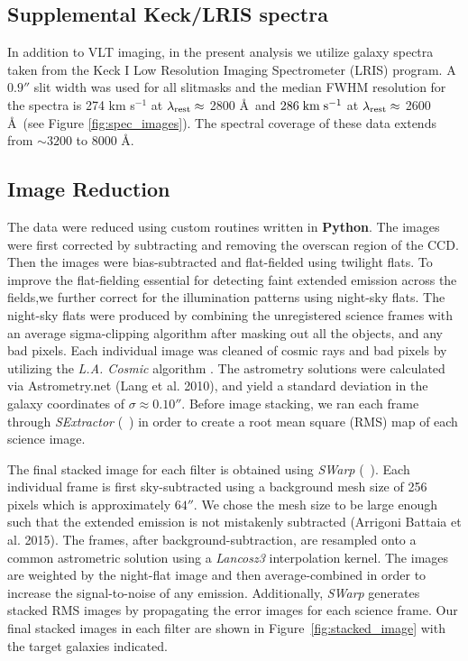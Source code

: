 \documentclass[twocolumn]{aastex61}
\newcommand{\citeth}[1]{(\citeauthor{#1}\ \citeyear{#1})}
\def \mkms {{\rm \; km\;s^{-1}}}
\begin{document}
\subsection{Supplemental Keck/LRIS spectra}
In addition to VLT imaging, in the present analysis we utilize galaxy spectra taken from the \cite{Rubin_2014} Keck I Low Resolution Imaging Spectrometer (LRIS) program.  A $0.9''$ slit width was used for all slitmasks and the median FWHM resolution for the spectra is 274 km s$^{-1}$ at $\lambda_{\rm rest} \approx$ 2800 \AA\ and $286\mkms$  at $\lambda_{\rm rest}\approx$ 2600 \AA\ (see Figure \ref{fig:spec_images}).  The spectral coverage of these data extends from ${\sim}3200$ to 8000 \AA.

\subsection{Image Reduction}
The data were reduced using custom routines written in \textbf{Python}. 
The images were first corrected by subtracting and removing the overscan region of the CCD. 
Then the images were bias-subtracted and flat-fielded using twilight flats.
To improve the flat-fielding essential for detecting faint extended emission across the fields,we further correct for the illumination patterns using night-sky flats. The night-sky flats were produced by combining the unregistered science frames with an average sigma-clipping algorithm after masking out all the objects, and any bad pixels. Each individual image was cleaned of cosmic rays and bad pixels by utilizing the \emph{L.A. Cosmic} algorithm \citep{Dokkum2001}.
The astrometry solutions were calculated via Astrometry.net (Lang et al. 2010)\nocite{Lang}, and yield a standard deviation in the galaxy coordinates of $\sigma \approx 0.10''$. Before image stacking, we ran each frame through \emph{SExtractor} \citeth{Bertin} in order to create a root mean square (RMS) map of each science image.


The final stacked image for each filter is obtained using \emph{SWarp} \citeth{Bertin}.
Each individual frame is first sky-subtracted using a background mesh size of 256 pixels which is approximately $64''$. 
We chose the mesh size to be large enough such that the extended emission is not mistakenly subtracted (Arrigoni Battaia et al. 2015)\nocite{Battaia_2015}. 
The frames, after background-subtraction, are resampled onto a common astrometric solution using a \textit{Lancosz3} interpolation kernel. 
The images are weighted by the night-flat image and then  average-combined  in order to increase the signal-to-noise of any  emission. Additionally, \emph{SWarp} generates stacked RMS images by propagating the error images for each science frame.
Our final stacked images in each filter are shown in Figure~\ref{fig:stacked_image} with the target galaxies indicated.  
\end{document}
